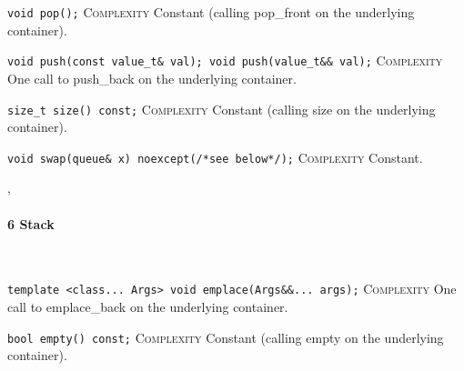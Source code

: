 \noindent{}\hspace*{0.25em}\lstinline[basicstyle=\ttfamily\color{cgreen}]{void pop();} \textsc{Complexity} Constant (calling pop\_front on the underlying container).\\\vspace{-0.6em}

\noindent{}\hspace*{0.25em}\lstinline{void push(const value_t& val); void push(value_t&& val);} \textsc{Complexity} One call to push\_back on the underlying container.\\\vspace{-0.6em}

\noindent{}\hspace*{0.25em}\lstinline[basicstyle=\ttfamily\color{cgreen}]{size_t size() const;} \textsc{Complexity} Constant (calling size on the underlying container).\\\vspace{-0.6em}

\noindent{}\hspace*{0.25em}\lstinline[basicstyle=\ttfamily\color{cgreen}]{void swap(queue& x) noexcept(/*see below*/);} \textsc{Complexity} Constant.\\\vspace{-0.6em}


\sep
{}
\paragraph{6 Stack}\mbox{}\vspace{0.5em}\\
\noindent{}\hspace*{0.25em}\lstinline{template <class... Args> void emplace(Args&&... args);} \textsc{Complexity} One call to emplace\_back on the underlying container.\\\vspace{-0.6em}

\noindent{}\hspace*{0.25em}\lstinline[basicstyle=\ttfamily\color{cgreen}]{bool empty() const;} \textsc{Complexity} Constant (calling empty on the underlying container).\\\vspace{-0.6em}

